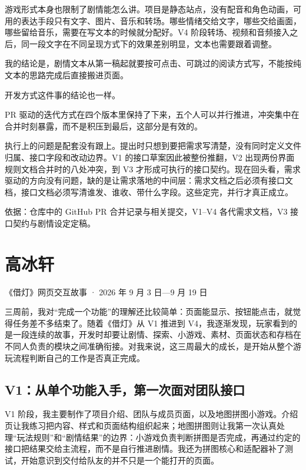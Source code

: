游戏形式本身也限制了剧情能怎么讲。项目是静态站点，没有配音和角色动画，可用的表达手段只有文字、图片、音乐和转场。哪些情绪交给文字，哪些交给画面，哪些留给音乐，需要在写文本的时候就分配好。V4 阶段转场、视频和音频接入之后，同一段文字在不同呈现方式下的效果差别明显，文本也需要跟着调整。

我的结论是，剧情文本从第一稿起就要按可点击、可跳过的阅读方式写，不能按纯文本的思路完成后直接搬进页面。

开发方式这件事的结论也一样。

PR 驱动的迭代方式在四个版本里保持了下来，五个人可以并行推进，冲突集中在合并时刻暴露，而不是积压到最后，这部分是有效的。

执行上的问题是配套没有跟上。提出时只想到要把需求写清楚，没有同时定义文件归属、接口字段和改动边界。V1 的接口草案因此被整份推翻，V2 出现两份界面规则文档合并时的八处冲突，到 V3 才形成可执行的接口契约。现在回头看，需求驱动的方向没有问题，缺的是让需求落地的中间层：需求文档之后必须有接口文档，接口文档必须写清谁发、谁收、带什么字段。这些定完，并行才真正成立。

\bigskip
{\small\color{black!55} 依据：仓库中的 GitHub PR 合并记录与相关提交，V1--V4 各代需求文档，V3 接口契约与剧情设定定稿。\par}

\section{高冰轩}

{\small\color{black!55}《借灯》网页交互故事 · 2026 年 9 月 3 日—9 月 19 日\par}

三周前，我对“完成一个功能”的理解还比较简单：页面能显示、按钮能点击，就觉得任务差不多结束了。随着《借灯》从 V1 推进到 V4，我逐渐发现，玩家看到的是一段连续的故事，开发时却要让剧情、探索、小游戏、素材、页面状态和存档在不同人负责的模块之间准确衔接。对我来说，这三周最大的成长，是开始从整个游玩流程判断自己的工作是否真正完成。

\subsection{V1：从单个功能入手，第一次面对团队接口}

V1 阶段，我主要制作了项目介绍、团队与成员页面，以及地图拼图小游戏。介绍页让我练习把内容、样式和页面结构组织起来；地图拼图则让我第一次认真处理“玩法规则”和“剧情结果”的边界：小游戏负责判断拼图是否完成，再通过约定的接口把结果交给主流程，而不是自行推进剧情。我还为拼图核心和适配器补了测试，开始意识到交付给队友的并不只是一个能打开的页面。

